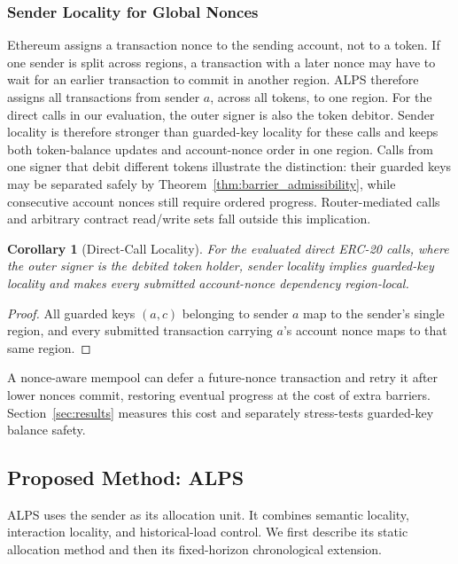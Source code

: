 \documentclass[conference,letterpaper]{IEEEtran}
\newtheorem{corollary}{Corollary}
\begin{document}
\subsubsection{Sender Locality for Global Nonces}

Ethereum assigns a transaction nonce to the sending account, not to a token.
If one sender is split across regions, a transaction with a later nonce may
have to wait for an earlier transaction to commit in another region. ALPS
therefore assigns all transactions from sender $a$, across all tokens, to one
region. For the direct calls in our evaluation, the outer signer is also the
token debitor. Sender locality is therefore stronger than guarded-key locality
for these calls and keeps both token-balance updates and account-nonce order in
one region. Calls from one signer that debit different tokens illustrate the
distinction: their guarded keys may be separated safely by
Theorem~\ref{thm:barrier_admissibility},
while consecutive account nonces still require ordered progress. Router-mediated
calls and arbitrary contract read/write sets fall outside this implication.

\begin{corollary}[Direct-Call Locality]
\label{cor:sender_locality}
For the evaluated direct ERC-20 calls, where the outer signer is the debited
token holder, sender locality implies guarded-key locality and makes every
submitted account-nonce dependency region-local.
\end{corollary}
\begin{proof}
All guarded keys $(a,c)$ belonging to sender $a$ map to the sender's single
region, and every submitted transaction carrying $a$'s account nonce maps to
that same region.
\end{proof}

A nonce-aware mempool can defer a future-nonce transaction and retry it after
lower nonces commit, restoring eventual progress at the cost of extra barriers.
Section~\ref{sec:results} measures this cost and separately stress-tests
guarded-key balance safety.

\subsection{Proposed Method: ALPS}
\label{sec:alps}

ALPS uses the sender as its allocation unit. It combines semantic locality,
interaction locality, and historical-load control. We first describe its
static allocation method and then its fixed-horizon chronological extension.
\end{document}
